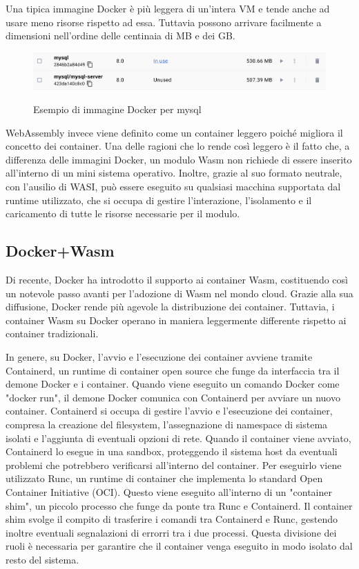 Una tipica immagine Docker è più leggera di un'intera VM e tende anche ad usare meno risorse rispetto ad essa. Tuttavia
possono arrivare facilmente a dimensioni nell'ordine delle centinaia di MB e dei GB.

\begin{figure}[h]
    \centering
    \captionsetup{justification=centering}
    \includegraphics[width=15cm]{./chapters/2.wasi-in-depth/images/8.docker-images-size.png}
    \label{mysql_docker_image}
    \caption{Esempio di immagine Docker per mysql}
\end{figure}

WebAssembly invece viene definito come un container leggero poiché migliora il concetto dei container. Una delle ragioni
che lo rende così leggero è il fatto che, a differenza delle immagini Docker, un modulo Wasm non richiede di essere
inserito all'interno di un mini sistema operativo. Inoltre, grazie al suo formato neutrale, con l'ausilio di WASI, può
essere eseguito su qualsiasi macchina supportata dal runtime utilizzato, che si occupa di gestire l'interazione,
l'isolamento e il caricamento di tutte le risorse necessarie per il modulo.

\subsection{Docker+Wasm}
Di recente, Docker ha introdotto il supporto ai container Wasm\cite{docker-wasm-tech-preview}, costituendo così un
notevole passo avanti per l'adozione di Wasm nel mondo cloud. Grazie alla sua diffusione, Docker rende più agevole la
distribuzione dei container. Tuttavia, i container Wasm su Docker operano in maniera leggermente differente rispetto ai
container tradizionali.

In genere, su Docker, l'avvio e l'esecuzione dei container avviene tramite Containerd, un runtime di container open
source che funge da interfaccia tra il demone Docker e i container. Quando viene eseguito un comando Docker come "docker
run", il demone Docker comunica con Containerd per avviare un nuovo container. Containerd si occupa di gestire l'avvio e
l'esecuzione dei container, compresa la creazione del filesystem, l'assegnazione di namespace di sistema isolati e
l'aggiunta di eventuali opzioni di rete. Quando il container viene avviato, Containerd lo esegue in una sandbox,
proteggendo il sistema host da eventuali problemi che potrebbero verificarsi all'interno del container. Per eseguirlo
viene utilizzato Runc, un runtime di container che implementa lo standard Open Container Initiative (OCI). Questo viene
eseguito all'interno di un "container shim", un piccolo processo che funge da ponte tra Runc e Containerd. Il container
shim svolge il compito di trasferire i comandi tra Containerd e Runc, gestendo inoltre eventuali segnalazioni di errorri
tra i due processi. Questa divisione dei ruoli è necessaria per garantire che il container venga eseguito in modo
isolato dal resto del sistema.

